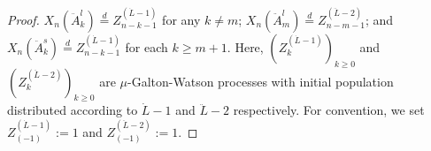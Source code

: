 \documentclass[12pt,a4paper]{amsart}
\numberwithin{equation}{section}
\begin{document}
\begin{proof}
	$X_n(\ddot A^l_k) \overset{d}{=} Z^{(\dot L - 1)}_{n-k-1}$ for any $k \neq m$;
	$X_n(\ddot A^l_m) \overset{d}{=} Z^{(\ddot L - 2)}_{n-m-1}$;
	and $X_n(\ddot A^s_k) \overset{d}{=} Z^{(\dot L - 1)}_{n-k-1}$ for each $k \geq m+1$.
	Here, $(Z^{(\dot L - 1)}_k)_{k\ge 0}$ and $(Z^{(\ddot L - 2)}_k)_{k\ge 0}$ are $\mu$-Galton-Watson processes with initial population distributed according to $\dot L-1$ and $\ddot L-2$ respectively.
	For convention, we set $Z^{(\dot L - 1)}_{(-1)}:= 1$ and $Z^{(\ddot L - 2)}_{(-1)}:= 1$.


\end{proof}
\end{document}
